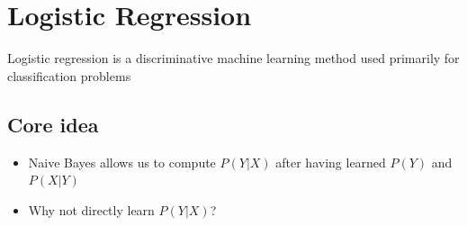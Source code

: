 \section{Logistic Regression}
Logistic regression is a discriminative machine learning method used primarily for classification problems

\subsection{Core idea}
\begin{itemize}
    \item Naive Bayes allows us to compute $P(Y |X )$ after having learned $P(Y)$ and $P(X |Y)$
    \item Why not directly learn $P(Y |X )$?
\end{itemize}

